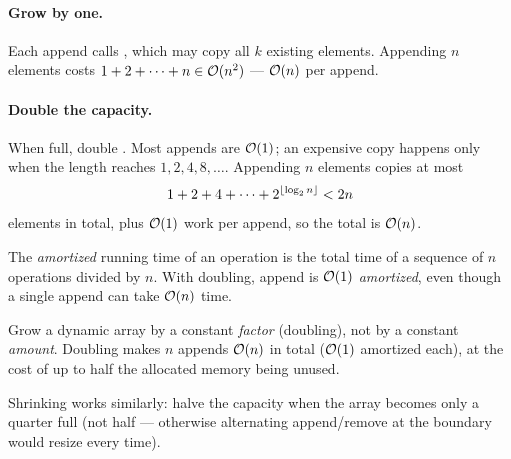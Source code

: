 \paragraph{Grow by one.} Each append calls , which may copy all $k$ existing
elements. Appending $n$ elements costs $1 + 2 + \dots + n \in \mathcal{O}(n^2)$ --- $\mathcal{O}(n)$ per append.

\paragraph{Double the capacity.} When full, double . Most appends are $\mathcal{O}(1)$; an
expensive copy happens only when the length reaches $1, 2, 4, 8, \dots$. Appending $n$ elements
copies at most
\[ 1 + 2 + 4 + \dots + 2^{\left\lfloor \log_2 n \right\rfloor} < 2n \]
elements in total, plus $\mathcal{O}(1)$ work per append, so the total is $\mathcal{O}(n)$.

\begin{center}
\end{center}

\begin{definition}
The \emph{amortized} running time of an operation is the total time of a sequence of $n$
operations divided by $n$. With doubling, append is $\mathcal{O}(1)$ \emph{amortized}, even though a
single append can take $\mathcal{O}(n)$ time.
\end{definition}

\begin{important}
Grow a dynamic array by a constant \emph{factor} (doubling), not by a constant \emph{amount}.
Doubling makes $n$ appends $\mathcal{O}(n)$ in total ($\mathcal{O}(1)$ amortized each), at the cost of up to
half the allocated memory being unused.
\end{important}

\begin{aside}
Shrinking works similarly: halve the capacity when the array becomes only a quarter full (not
half --- otherwise alternating append/remove at the boundary would resize every time).
\end{aside}

